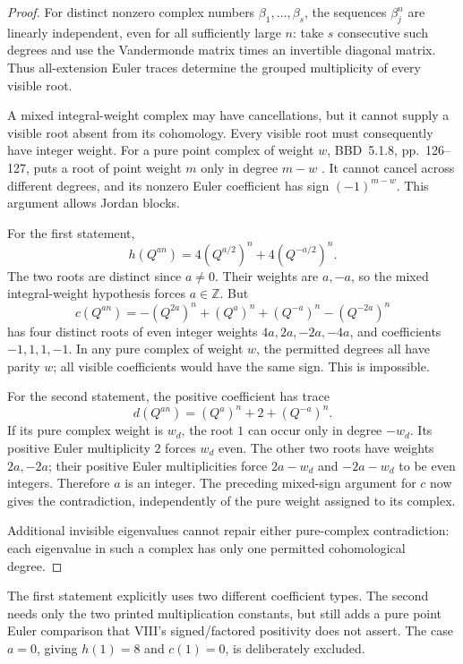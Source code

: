 \begin{proof}
For distinct nonzero complex numbers \(\beta_1,\ldots,\beta_s\),
the sequences \(\beta_j^n\) are linearly independent,
even for all sufficiently large \(n\): take \(s\)
consecutive such degrees and use the Vandermonde matrix
times an invertible diagonal matrix.
Thus all-extension Euler traces determine the grouped
multiplicity of every visible root.

A mixed integral-weight complex may have cancellations,
but it cannot supply a visible root absent from its
cohomology. Every visible root must consequently have
integer weight.
For a pure point complex of weight \(w\), BBD~5.1.8,
pp.~126--127, puts a root of point weight \(m\)
only in degree \(m-w\) \cite{BBD}.
It cannot cancel across different degrees, and its
nonzero Euler coefficient has sign \((-1)^{m-w}\).
This argument allows Jordan blocks.

For the first statement,
\[
             h(Q^{an})=4(Q^{a/2})^n+4(Q^{-a/2})^n.
\]
The two roots are distinct since \(a\ne0\). Their weights
are \(a,-a\), so the mixed integral-weight hypothesis
forces \(a\in\mathbb Z\). But
\[
 c(Q^{an})=-(Q^{2a})^n+(Q^a)^n
                  +(Q^{-a})^n-(Q^{-2a})^n
\]
has four distinct roots of even integer weights
\(4a,2a,-2a,-4a\), and coefficients \(-1,1,1,-1\).
In any pure complex of weight \(w\), the permitted
degrees all have parity \(w\); all visible coefficients
would have the same sign. This is impossible.

For the second statement, the positive coefficient has
trace
\[
                     d(Q^{an})=(Q^a)^n+2+(Q^{-a})^n.
\]
If its pure complex weight is \(w_d\), the root \(1\)
can occur only in degree \(-w_d\). Its positive Euler
multiplicity \(2\) forces \(w_d\) even.
The other two roots have weights \(2a,-2a\); their
positive Euler multiplicities force
\(2a-w_d\) and \(-2a-w_d\) to be even integers.
Therefore \(a\) is an integer. The preceding
mixed-sign argument for \(c\) now gives the contradiction,
independently of the pure weight assigned to its complex.

Additional invisible eigenvalues cannot repair either
pure-complex contradiction: each eigenvalue in such a
complex has only one permitted cohomological degree.
\end{proof}

The first statement explicitly uses two different coefficient
types. The second needs only the two printed multiplication
constants, but still adds a pure point Euler comparison
that VIII's signed/factored positivity does not assert.
The case \(a=0\), giving \(h(1)=8\) and \(c(1)=0\),
is deliberately excluded.

